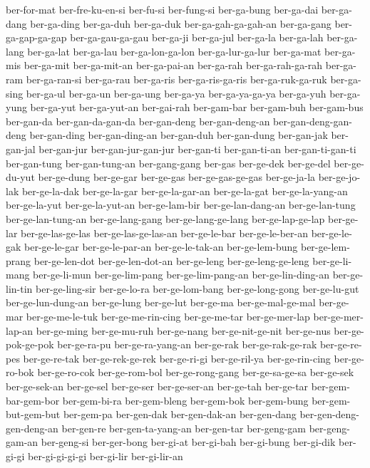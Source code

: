 {ber-for-mat ber-fre-ku-en-si ber-fu-si ber-fung-si ber-ga-bung ber-ga-dai
ber-ga-dang ber-ga-ding ber-ga-duh ber-ga-duk ber-ga-gah-ga-gah-an
ber-ga-gang ber-ga-gap-ga-gap ber-ga-gau-ga-gau ber-ga-ji ber-ga-jul
ber-ga-la ber-ga-lah ber-ga-lang ber-ga-lat ber-ga-lau ber-ga-lon-ga-lon
ber-ga-lur-ga-lur ber-ga-mat ber-ga-mis ber-ga-mit ber-ga-mit-an
ber-ga-pai-an ber-ga-rah ber-ga-rah-ga-rah ber-ga-ram ber-ga-ran-si
ber-ga-rau ber-ga-ris ber-ga-ris-ga-ris ber-ga-ruk-ga-ruk ber-ga-sing
ber-ga-ul ber-ga-un ber-ga-ung ber-ga-ya ber-ga-ya-ga-ya ber-ga-yuh
ber-ga-yung ber-ga-yut ber-ga-yut-an ber-gai-rah ber-gam-bar ber-gam-buh
ber-gam-bus ber-gan-da ber-gan-da-gan-da ber-gan-deng ber-gan-deng-an
ber-gan-deng-gan-deng ber-gan-ding ber-gan-ding-an ber-gan-duh
ber-gan-dung ber-gan-jak ber-gan-jal ber-gan-jur ber-gan-jur-gan-jur
ber-gan-ti ber-gan-ti-an ber-gan-ti-gan-ti ber-gan-tung ber-gan-tung-an
ber-gang-gang ber-gas ber-ge-dek ber-ge-del ber-ge-du-yut ber-ge-dung
ber-ge-gar ber-ge-gas ber-ge-gas-ge-gas ber-ge-ja-la ber-ge-jo-lak
ber-ge-la-dak ber-ge-la-gar ber-ge-la-gar-an ber-ge-la-gat
ber-ge-la-yang-an ber-ge-la-yut ber-ge-la-yut-an ber-ge-lam-bir
ber-ge-lan-dang-an ber-ge-lan-tung ber-ge-lan-tung-an ber-ge-lang-gang
ber-ge-lang-ge-lang ber-ge-lap-ge-lap ber-ge-lar ber-ge-las-ge-las
ber-ge-las-ge-las-an ber-ge-le-bar ber-ge-le-ber-an ber-ge-le-gak
ber-ge-le-gar ber-ge-le-par-an ber-ge-le-tak-an ber-ge-lem-bung
ber-ge-lem-prang ber-ge-len-dot ber-ge-len-dot-an ber-ge-leng
ber-ge-leng-ge-leng ber-ge-li-mang ber-ge-li-mun ber-ge-lim-pang
ber-ge-lim-pang-an ber-ge-lin-ding-an ber-ge-lin-tin ber-ge-ling-sir
ber-ge-lo-ra ber-ge-lom-bang ber-ge-long-gong ber-ge-lu-gut
ber-ge-lun-dung-an ber-ge-lung ber-ge-lut ber-ge-ma ber-ge-mal-ge-mal
ber-ge-mar ber-ge-me-le-tuk ber-ge-me-rin-cing ber-ge-me-tar
ber-ge-mer-lap ber-ge-mer-lap-an ber-ge-ming ber-ge-mu-ruh ber-ge-nang
ber-ge-nit-ge-nit ber-ge-nus ber-ge-pok-ge-pok ber-ge-ra-pu
ber-ge-ra-yang-an ber-ge-rak ber-ge-rak-ge-rak ber-ge-re-pes ber-ge-re-tak
ber-ge-rek-ge-rek ber-ge-ri-gi ber-ge-ril-ya ber-ge-rin-cing ber-ge-ro-bok
ber-ge-ro-cok ber-ge-rom-bol ber-ge-rong-gang ber-ge-sa-ge-sa ber-ge-sek
ber-ge-sek-an ber-ge-sel ber-ge-ser ber-ge-ser-an ber-ge-tah ber-ge-tar
ber-gem-bar-gem-bor ber-gem-bi-ra ber-gem-bleng ber-gem-bok ber-gem-bung
ber-gem-but-gem-but ber-gem-pa ber-gen-dak ber-gen-dak-an ber-gen-dang
ber-gen-deng-gen-deng-an ber-gen-re ber-gen-ta-yang-an ber-gen-tar
ber-geng-gam ber-geng-gam-an ber-geng-si ber-ger-bong ber-gi-at ber-gi-bah
ber-gi-bung ber-gi-dik ber-gi-gi ber-gi-gi-gi-gi ber-gi-lir ber-gi-lir-an
}
